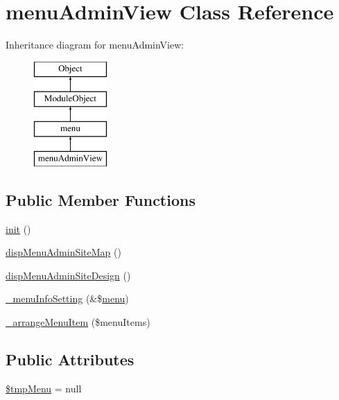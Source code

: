 \hypertarget{classmenuAdminView}{\section{menu\-Admin\-View Class Reference}
\label{classmenuAdminView}
}
Inheritance diagram for menu\-Admin\-View\-:\begin{figure}[H]
\begin{center}
\leavevmode
\includegraphics[height=4.000000cm]{classmenuAdminView}
\end{center}
\end{figure}
\subsection*{Public Member Functions}
\begin{DoxyCompactItemize}
\item 
\hyperlink{classmenuAdminView_ae7bc53b51dbc5c57f396420ec4180db0}{init} ()
\item 
\hyperlink{classmenuAdminView_afa55cc43041d721b52b8504c3b34e625}{disp\-Menu\-Admin\-Site\-Map} ()
\item 
\hyperlink{classmenuAdminView_a29d653c99c2e86ed5b8324042ef447ba}{disp\-Menu\-Admin\-Site\-Design} ()
\item 
\hyperlink{classmenuAdminView_abbcdc54eb95b1c114d43c347fd1f1008}{\-\_\-menu\-Info\-Setting} (\&\$\hyperlink{classmenu}{menu})
\item 
\hyperlink{classmenuAdminView_a9ae9e6a8ade5abcef97bd946d4ca99f7}{\-\_\-arrange\-Menu\-Item} (\$menu\-Items)
\end{DoxyCompactItemize}
\subsection*{Public Attributes}
\begin{DoxyCompactItemize}
\item 
\hyperlink{classmenuAdminView_a50d98e62711bbf3f6326b4aab2bcb12a}{\$tmp\-Menu} = null
\end{DoxyCompactItemize}


